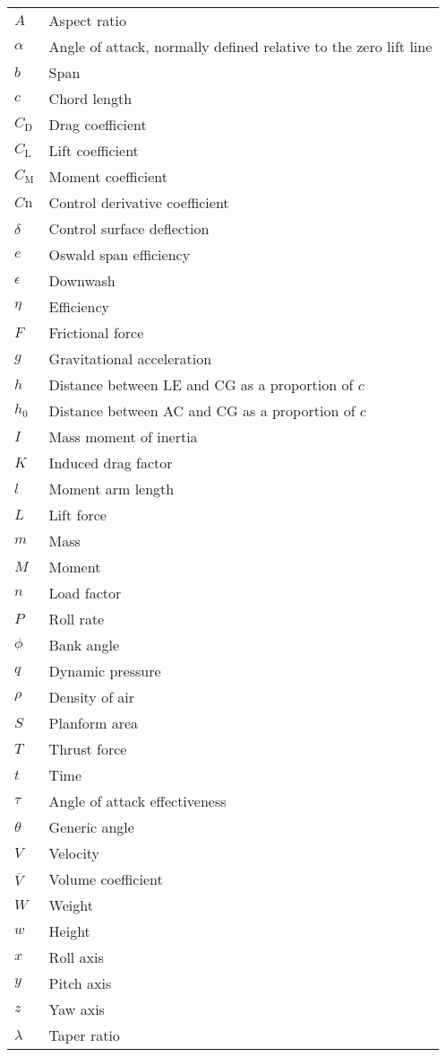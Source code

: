 \documentclass[../main.tex]{subfiles}
\newcommand{\appendixtable}[2]{
    \begin{table}[H]
        \begin{tabular}{#1}
            #2
        \end{tabular}
    \end{table}
}
\begin{document}
\appendixtable{l l}{
    $A$ & Aspect ratio \\
    $\alpha$ & Angle of attack, normally defined relative to the zero lift line \\
    $b$ & Span \\
    $c$ & Chord length \\
    $C_\mathrm{D}$ & Drag coefficient \\
    $C_\mathrm{L}$ & Lift coefficient \\
    $C_\mathrm{M}$ & Moment coefficient \\
    $C\mathrm{n}$ & Control derivative coefficient \\
    $\delta$ & Control surface deflection \\
    $e$ & Oswald span efficiency \\
    $\epsilon$ & Downwash \\
    $\eta$ & Efficiency \\
    $F$ & Frictional force \\
    $g$ & Gravitational acceleration \\
    $h$ & Distance between LE and CG as a proportion of $c$ \\
    $h_0$ & Distance between AC and CG as a proportion of $c$ \\
    $I$ & Mass moment of inertia \\
    $K$ & Induced drag factor \\
    $l$ & Moment arm length \\
    $L$ & Lift force \\
    $m$ & Mass \\
    $M$ & Moment \\
    $n$ & Load factor \\
    $P$ & Roll rate \\
    $\phi$ & Bank angle \\
    $q$ & Dynamic pressure \\
    $\rho$ & Density of air \\
    $S$ & Planform area \\
    $T$ & Thrust force \\
    $t$ & Time \\
    $\tau$ & Angle of attack effectiveness \\
    $\theta$ & Generic angle \\
    $V$ & Velocity \\
    $\overline{V}$ & Volume coefficient \\
    $W$ & Weight \\
    $w$ & Height \\
    $x$ & Roll axis \\
    $y$ & Pitch axis \\
    $z$ & Yaw axis \\
    $\lambda$ & Taper ratio \\
}
\end{document}
